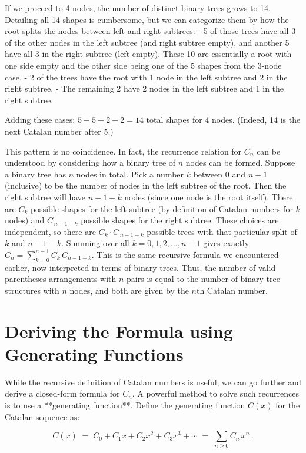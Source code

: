 \documentclass{article}
\begin{document}
If we proceed to 4 nodes, the number of distinct binary trees grows to 14. Detailing all 14 shapes is cumbersome, but we can categorize them by how the root splits the nodes between left and right subtrees:
- 5 of those trees have all 3 of the other nodes in the left subtree (and right subtree empty), and another 5 have all 3 in the right subtree (left empty). These 10 are essentially a root with one side empty and the other side being one of the 5 shapes from the 3-node case.
- 2 of the trees have the root with 1 node in the left subtree and 2 in the right subtree.
- The remaining 2 have 2 nodes in the left subtree and 1 in the right subtree.

Adding these cases: $5 + 5 + 2 + 2 = 14$ total shapes for 4 nodes. (Indeed, 14 is the next Catalan number after 5.)

This pattern is no coincidence. In fact, the recurrence relation for $C_n$ can be understood by considering how a binary tree of $n$ nodes can be formed. Suppose a binary tree has $n$ nodes in total. Pick a number $k$ between $0$ and $n-1$ (inclusive) to be the number of nodes in the left subtree of the root. Then the right subtree will have $n-1-k$ nodes (since one node is the root itself). There are $C_k$ possible shapes for the left subtree (by definition of Catalan numbers for $k$ nodes) and $C_{\,n-1-k}$ possible shapes for the right subtree. These choices are independent, so there are $C_k \cdot C_{\,n-1-k}$ possible trees with that particular split of $k$ and $n-1-k$. Summing over all $k=0,1,2,\dots,n-1$ gives exactly $C_n = \sum_{k=0}^{n-1} C_k\,C_{n-1-k}$. This is the same recursive formula we encountered earlier, now interpreted in terms of binary trees. Thus, the number of valid parentheses arrangements with $n$ pairs is equal to the number of binary tree structures with $n$ nodes, and both are given by the $n$th Catalan number.

\section{Deriving the Formula using Generating Functions}

While the recursive definition of Catalan numbers is useful, we can go further and derive a closed-form formula for $C_n$. A powerful method to solve such recurrences is to use a **generating function**. Define the generating function $C(x)$ for the Catalan sequence as:

\[
C(x) \;=\; C_0 + C_1 x + C_2 x^2 + C_3 x^3 + \cdots \;=\; \sum_{n\ge 0} C_n \, x^n\,.
\]
\end{document}
